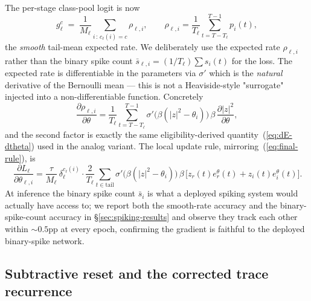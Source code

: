 \documentclass[11pt]{article}
\newcommand{\zr}{z_r}
\newcommand{\zi}{z_i}
\begin{document}
The per-stage class-pool logit is now
\begin{equation}
g_\ell^c \;=\; \frac{1}{M_\ell}\!\!\!\sum_{i\,:\,c_\ell(i)=c}\!\!\!
                \rho_{\ell, i},
\qquad
\rho_{\ell, i} = \frac{1}{T_\ell}\!\!\!\sum_{t = T - T_\ell}^{T-1}\!\!\!
p_i(t),
\end{equation}
the \emph{smooth} tail-mean expected rate. We deliberately use the
expected rate $\rho_{\ell, i}$ rather than the binary spike count
$\bar s_{\ell, i} = (1/T_\ell)\sum s_i(t)$ for the loss. The
expected rate is differentiable in the parameters via $\sigma'$ which
is the \emph{natural} derivative of the Bernoulli mean --- this is
not a Heaviside-style "surrogate" injected into a non-differentiable
function. Concretely
\begin{equation}
\frac{\partial \rho_{\ell, i}}{\partial \theta}
= \frac{1}{T_\ell}\!\!\!\sum_{t = T - T_\ell}^{T-1}\!\!\!
\sigma'\!\big(\beta(|z|^2 - \theta_i)\big)\,\beta\,
\frac{\partial |z|^2}{\partial \theta},
\label{eq:drho-dtheta}
\end{equation}
and the second factor is exactly the same eligibility-derived
quantity~(\ref{eq:dE-dtheta}) used in the analog variant. The local
update rule, mirroring~(\ref{eq:final-rule}), is
\begin{equation}
\boxed{\quad
\frac{\partial L_\ell}{\partial \theta_{\ell, i}}
= \frac{\tau}{M_\ell}\,\delta_\ell^{c_\ell(i)} \cdot
  \frac{2}{T_\ell}\!\!\!\sum_{t \in \text{tail}}\!\!\!
\sigma'\!\big(\beta(|z|^2 - \theta_i)\big)\,\beta\,
\big[\zr(t) e^\theta_r(t) + \zi(t) e^\theta_i(t)\big].
\quad}
\label{eq:final-rule-spike}
\end{equation}
At inference the binary spike count $\bar s_i$ is what a deployed
spiking system would actually have access to; we report both the
smooth-rate accuracy and the binary-spike-count accuracy in
\S\ref{sec:spiking-results} and observe they track each other within
$\sim 0.5$pp at every epoch, confirming the gradient is faithful to
the deployed binary-spike network.

\subsection{Subtractive reset and the corrected trace recurrence}\label{sec:spiking-reset}
\end{document}
